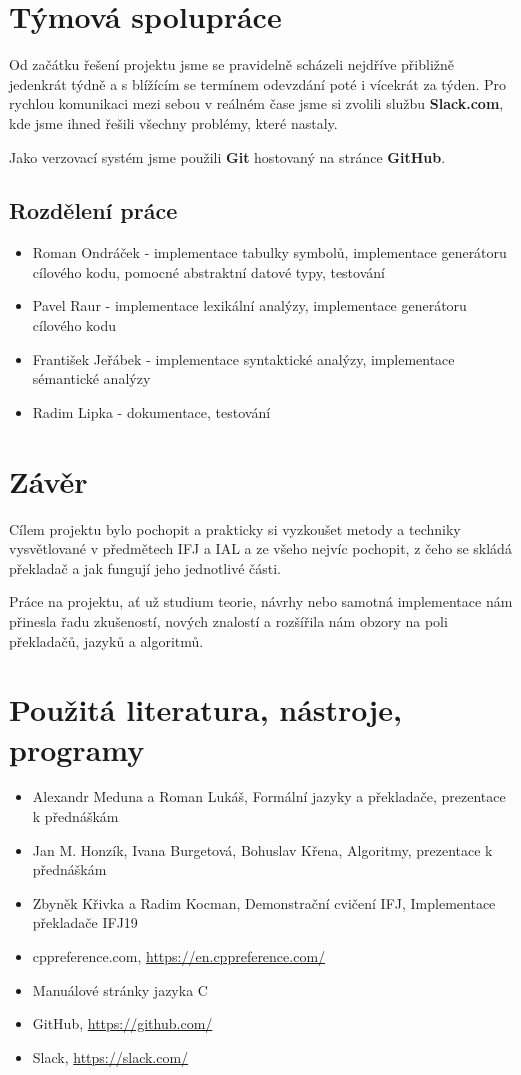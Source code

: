 \documentclass[12pt]{article}
\begin{document}
\newpage

\section{Týmová spolupráce}
Od začátku řešení projektu jsme se pravidelně scházeli nejdříve přibližně jedenkrát týdně a s blížícím se termínem odevzdání poté i vícekrát za týden. Pro rychlou komunikaci mezi sebou v reálném čase jsme si zvolili službu \textbf{Slack.com}, kde jsme ihned řešili všechny problémy, které nastaly.

Jako verzovací systém jsme použili \textbf{Git} hostovaný na stránce \textbf{GitHub}. 
\subsection{Rozdělení práce}
\begin{itemize}
  \item Roman Ondráček - implementace tabulky symbolů, implementace generátoru cílového kodu, pomocné abstraktní datové typy, testování
  \item Pavel Raur - implementace lexikální analýzy, implementace generátoru cílového kodu
  \item František Jeřábek - implementace syntaktické analýzy, implementace sémantické analýzy
  \item Radim Lipka - dokumentace, testování
\end{itemize}
\section{Závěr}
Cílem projektu bylo pochopit a prakticky si vyzkoušet metody a techniky vysvětlované v předmětech IFJ a IAL a ze všeho nejvíc pochopit, z čeho se skládá překladač a jak fungují jeho jednotlivé části. 

Práce na projektu, ať už studium teorie, návrhy nebo samotná implementace nám přinesla řadu zkušeností, nových znalostí a rozšířila nám obzory na poli překladačů, jazyků a algoritmů.
\section{Použitá literatura, nástroje, programy}
\begin{itemize}
  \item Alexandr Meduna a Roman Lukáš, Formální jazyky a překladače, prezentace k přednáškám
  \item Jan M. Honzík, Ivana Burgetová, Bohuslav Křena, Algoritmy, prezentace k přednáškám
  \item Zbyněk Křivka a Radim Kocman, Demonstrační cvičení IFJ, Implementace překladače IFJ19 
  \item cppreference.com, \href{https://en.cppreference.com/}{https://en.cppreference.com/}
  \item Manuálové stránky jazyka C
  \item GitHub, \href{https://github.com/}{https://github.com/}
  \item Slack, \href{https://slack.com/}{https://slack.com/}
\end{itemize}
\end{document}
